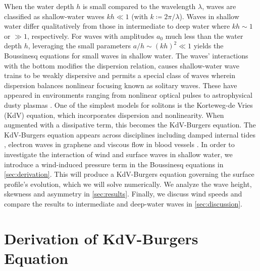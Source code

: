 \documentclass{jfm}
\begin{document}
When the water depth $h$ is small compared to the wavelength $\lambda$,
waves are classified as shallow-water waves $kh \ll 1$ (with $k
\coloneqq 2 \pi/\lambda$).
Waves in shallow water differ qualitatively from those in intermediate
to deep water where $kh \sim 1$ or $\gg 1$, respectively.
For waves with amplitudes $a_0$ much less than the water depth $h$,
leveraging the small parameters $a/h \sim (kh)^2 \ll 1$
yields the Boussinesq equations for small waves in shallow water.
The waves' interactions with the bottom modifies the dispersion
relation, causes shallow-water wave trains to be weakly dispersive and
permits a special class of waves wherein dispersion balances nonlinear
focusing known as solitary waves.
These have appeared in environments ranging from nonlinear optical pulses
\citep[\eg][]{kivshar1993dark} to astrophysical dusty plasmas
\citep[\eg][]{sahu2012nonextensive}.
One of the simplest models for solitons is the Korteweg-de Vries (KdV)
equation, which incorporates dispersion and nonlinearity.
When augmented with a dissipative term, this becomes the KdV-Burgers
equation.
The KdV-Burgers equation appears across disciplines including damped
internal tides \citep[\eg][]{sandstrom1995dissipation}, electron waves
in graphene \citep[\eg][]{zdyrski2019effects} and viscous flow in blood
vessels \citep[\eg][]{antar1999weakly}.
In order to investigate the interaction of wind and surface waves in
shallow water, we introduce a wind-induced pressure term in the
Boussinesq equations in \cref{sec:derivation}.
This will produce a KdV-Burgers equation governing the surface profile's
evolution, which we will solve numerically.
We analyze the wave height, skewness and asymmetry in
\cref{sec:results}.
Finally, we discuss wind speeds and compare the results to intermediate
and deep-water waves in \cref{sec:discussion}.

\section{\label{sec:derivation} Derivation of KdV-Burgers Equation}
\end{document}

